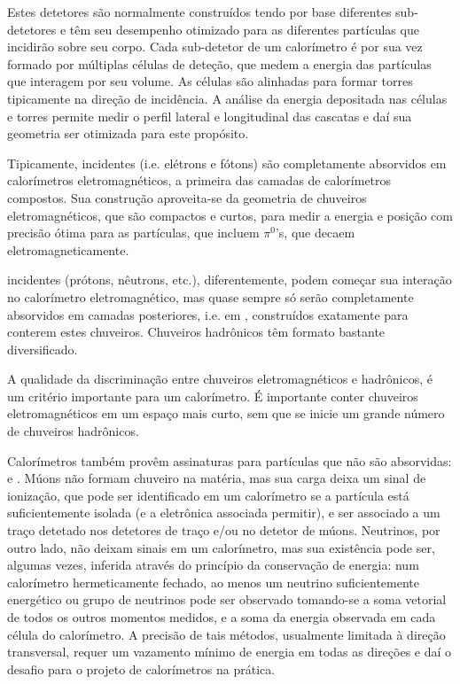 Estes detetores são normalmente construídos tendo por base diferentes
sub-detetores e têm seu desempenho otimizado para as diferentes partículas que
incidirão sobre seu corpo. Cada sub-detetor de um calorímetro é por sua vez
formado por múltiplas células de deteção, que medem a energia das partículas
que interagem por seu volume. As células são alinhadas para formar torres
tipicamente na direção de incidência. A análise da energia depositada nas
células e torres permite medir o perfil lateral e longitudinal das cascatas e
daí sua geometria ser otimizada para este propósito.

Tipicamente,  incidentes (i.e. elétrons e
fótons) são completamente absorvidos em calorímetros eletromagnéticos, a
primeira das camadas de calorímetros compostos. Sua construção aproveita-se da
geometria de chuveiros eletromagnéticos, que são compactos e curtos, para
medir a energia e posição com precisão ótima para as partículas, que
incluem $\pi^{0}$'s, que decaem eletromagneticamente.

 incidentes (prótons, nêutrons, etc.), diferentemente,
podem começar sua interação no calorímetro eletromagnético, mas quase sempre
só serão completamente absorvidos em camadas posteriores, i.e. em
, construídos exatamente para conterem estes
chuveiros. Chuveiros hadrônicos têm formato bastante diversificado.

A qualidade da discriminação entre chuveiros eletromagnéticos e hadrônicos, é
um critério importante para um calorímetro. É importante conter chuveiros
eletromagnéticos em um espaço mais curto, sem que se inicie um grande número
de chuveiros hadrônicos.

Calorímetros também provêm assinaturas para partículas que não são absorvidas:
 e . Múons não formam chuveiro na matéria, mas sua
carga deixa um sinal de ionização, que pode ser identificado em um calorímetro
se a partícula está suficientemente isolada (e a eletrônica associada
permitir), e ser associado a um traço detetado nos detetores de traço e/ou no
detetor de múons. Neutrinos, por outro lado, não deixam sinais em um
calorímetro, mas sua existência pode ser, algumas vezes, inferida através do
princípio da conservação de energia: num calorímetro hermeticamente fechado,
ao menos um neutrino suficientemente energético ou grupo de neutrinos pode ser
observado tomando-se a soma vetorial de todos os outros momentos medidos, e a
soma da energia observada em cada célula do calorímetro. A precisão de tais
métodos, usualmente limitada à direção transversal, requer um vazamento mínimo
de energia em todas as direções e daí o desafio para o projeto de calorímetros
na prática.

